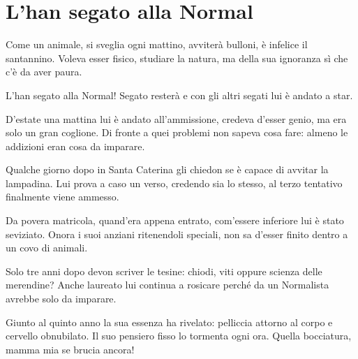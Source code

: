 \section{L’han segato alla Normal}
\begin{canzone}
Come un animale, si sveglia ogni mattino,
avviterà bulloni, è infelice il santannino.
Voleva esser fisico, studiare la natura,
ma della sua ignoranza sì che c'è da aver paura.

\aritskip L’han segato alla Normal!
\aritskip Segato resterà
\aritskip e con gli altri segati
\aritskip lui è andato a star.

D'estate una mattina lui è andato all'ammissione,
credeva d'esser genio, ma era solo un gran coglione.
Di fronte a quei problemi non sapeva cosa fare:
almeno le addizioni eran cosa da imparare.

\RIT

Qualche giorno dopo in Santa Caterina
gli chiedon se è capace di avvitar la lampadina.
Lui prova a caso un verso, credendo sia lo stesso,
al terzo tentativo finalmente viene ammesso.

\RIT

Da povera matricola, quand'era appena entrato,
com'essere inferiore lui è stato seviziato.
Onora i suoi anziani ritenendoli speciali,
non sa d'esser finito dentro a un covo di animali.

\RIT

Solo tre anni dopo devon scriver le tesine:
chiodi, viti oppure scienza delle merendine?
Anche laureato lui continua a rosicare
perché da un Normalista avrebbe solo da imparare.

\RIT

Giunto al quinto anno la sua essenza ha rivelato:
pelliccia attorno al corpo e cervello obnubilato.
Il suo pensiero fisso lo tormenta ogni ora.
Quella bocciatura, mamma mia se brucia ancora!

\RITB
\end{canzone}
